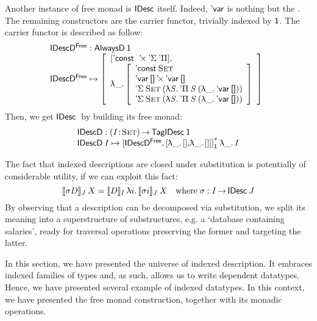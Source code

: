 Another instance of free monad is $\SYMBIDesc$ itself. Indeed,
$\SYMBDVar$ is nothing but the \return. The remaining constructors are
the carrier functor, trivially indexed by $\Unit$. The carrier functor
is described as follow:
%
\[\stk{
\IDescFreeD : \ATagIDesc{\Unit} \\
\begin{array}{@{}ll}
\IDescFreeD \mapsto \bigRedBracket{\begin{array}{l}
                                \sqr{\SYMBDConst\:
                                     \DProd\:
                                     \SYMBDSigma\: 
                                     \SYMBDPi} \red{,}\\
                                  \LAM{\_}\bigRedBracket{\begin{array}{l}
                                        \DConst{\Set}               \\
                                        \DProd{\DVar{\Void}}{\DVar{\Void}}  \\
                                        \DSigma{\Set}{(\LAM{\V{S}} \DPi{\V{S}}{(\LAM{\_} \DVar{\Void})})} \\
                                        \DSigma{\Set}{(\LAM{\V{S}} \DPi{\V{S}}{(\LAM{\_} \DVar{\Void})})}
                                    \end{array}}\end{array}}
\end{array}
}\]
%
Then, we get $\IDesc$ by building its free monad:
%
\[\stk{
\IDescD : \PI{\V{I}}{\Set} \TagIDesc{\Unit} \\
\IDescD\: \V{I} \mapsto \FreeIMonad{\red{[}\IDescFreeD\red{,[}\LAM{\_}\sqr{}\red{,}\LAM{\_}\red{[]]]}}{\Unit}\LAM{\_}\V{I}
}\]

The fact that indexed descriptions are closed under substitution
is potentially of considerable utility, if we can exploit this fact:
\[
\idescop{\sigma D}{J}{X} = \idescop{D}{I}{\LAM{i}\idescop{\sigma i}{J}{X}}
\quad \mbox{where}\;\sigma:I\To\IDesc{J}
\]
By observing that a description can be decomposed via substitution, we
split its meaning into a superstructure of substructures, e.g. a
`database containing salaries', ready for traversal operations
preserving the former and targeting the latter.

In this section, we have presented the universe of indexed
description. It embraces indexed families of types and, as such,
allows us to write dependent datatypes. Hence, we have presented
several example of indexed datatypes. In this context, we have
presented the free monad construction, together with its monadic
operations.
